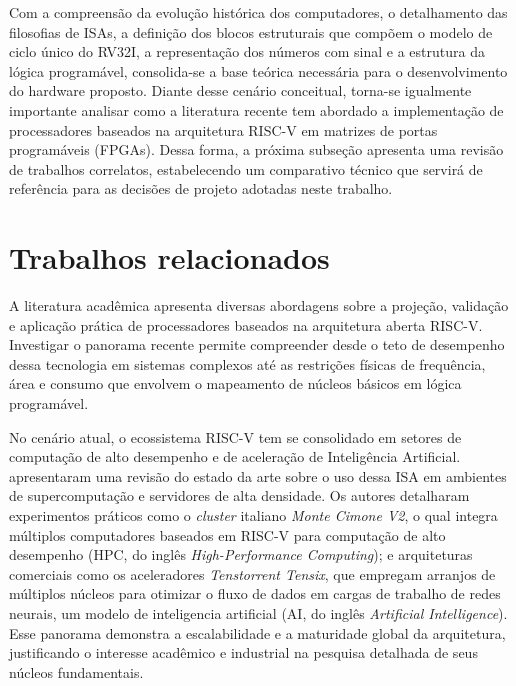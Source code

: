 Com a compreensão da evolução histórica dos computadores, o detalhamento das filosofias de ISAs, a definição dos blocos estruturais que compõem o modelo de ciclo único do RV32I, a representação dos números com sinal e a estrutura da lógica programável, consolida-se a base teórica necessária para o desenvolvimento do hardware proposto. Diante desse cenário conceitual, torna-se igualmente importante analisar como a literatura recente tem abordado a implementação de processadores baseados na arquitetura RISC-V em matrizes de portas programáveis (FPGAs). Dessa forma, a próxima subseção apresenta uma revisão de trabalhos correlatos, estabelecendo um comparativo técnico que servirá de referência para as decisões de projeto adotadas neste trabalho.

\section{Trabalhos relacionados}
\label{sec:trabalhosRelacionados}

A literatura acadêmica apresenta diversas abordagens sobre a projeção, validação e aplicação prática de processadores baseados na arquitetura aberta RISC-V. Investigar o panorama recente permite compreender desde o teto de desempenho dessa tecnologia em sistemas complexos até as restrições físicas de frequência, área e consumo que envolvem o mapeamento de núcleos básicos em lógica programável.

No cenário atual, o ecossistema RISC-V tem se consolidado em setores de computação de alto desempenho e de aceleração de Inteligência Artificial.  apresentaram uma revisão do estado da arte sobre o uso dessa ISA em ambientes de supercomputação e servidores de alta densidade. Os autores detalharam experimentos práticos como o \textit{cluster} italiano \textit{Monte Cimone V2}, o qual integra múltiplos computadores baseados em RISC-V para computação de alto desempenho (HPC, do inglês \textit{High-Performance Computing}); e arquiteturas comerciais como os aceleradores \textit{Tenstorrent Tensix}, que empregam arranjos de múltiplos núcleos para otimizar o fluxo de dados em cargas de trabalho de redes neurais, um modelo de inteligencia artificial (AI, do inglês \textit{Artificial Intelligence}). Esse panorama demonstra a escalabilidade e a maturidade global da arquitetura, justificando o interesse acadêmico e industrial na pesquisa detalhada de seus núcleos fundamentais.

